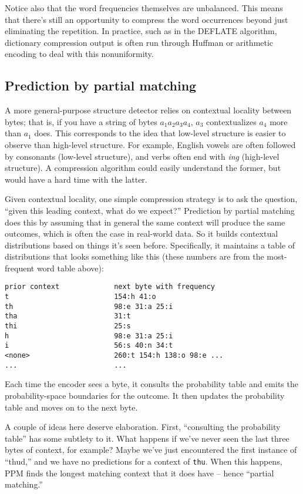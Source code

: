 \documentclass{article}
\begin{document}
    Notice also that the word frequencies themselves are unbalanced. This means
    that there's still an opportunity to compress the word occurrences beyond
    just eliminating the repetition. In practice, such as in the DEFLATE
    algorithm, dictionary compression output is often run through Huffman or
    arithmetic encoding to deal with this nonuniformity.

\subsection{Prediction by partial matching}\label{sec:ppm}
    A more general-purpose structure detector relies on contextual locality
    between bytes; that is, if you have a string of bytes $a_1 a_2 a_3 a_4$,
    $a_3$ contextualizes $a_4$ more than $a_1$ does. This corresponds to the
    idea that low-level structure is easier to observe than high-level
    structure. For example, English vowels are often followed by consonants
    (low-level structure), and verbs often end with {\em ing} (high-level
    structure). A compression algorithm could easily understand the former, but
    would have a hard time with the latter.

    Given contextual locality, one simple compression strategy is to ask the
    question, ``given this leading context, what do we expect?'' Prediction by
    partial matching does this by assuming that in general the same context
    will produce the same outcomes, which is often the case in real-world data.
    So it builds contextual distributions based on things it's seen before.
    Specifically, it maintains a table of distributions that looks something
    like this (these numbers are from the most-frequent word table above):

\begin{verbatim}
prior context             next byte with frequency
t                         154:h 41:o
th                        98:e 31:a 25:i
tha                       31:t
thi                       25:s
h                         98:e 31:a 25:i
i                         56:s 40:n 34:t
<none>                    260:t 154:h 138:o 98:e ...
...                       ...
\end{verbatim}

    Each time the encoder sees a byte, it consults the probability table and
    emits the probability-space boundaries for the outcome. It then updates the
    probability table and moves on to the next byte.

    A couple of ideas here deserve elaboration. First, ``consulting the
    probability table'' has some subtlety to it. What happens if we've never
    seen the last three bytes of context, for example? Maybe we've just
    encountered the first instance of ``thud,'' and we have no predictions for
    a context of {\tt thu}. When this happens, PPM finds the longest matching
    context that it does have -- hence ``partial matching.''
\end{document}
